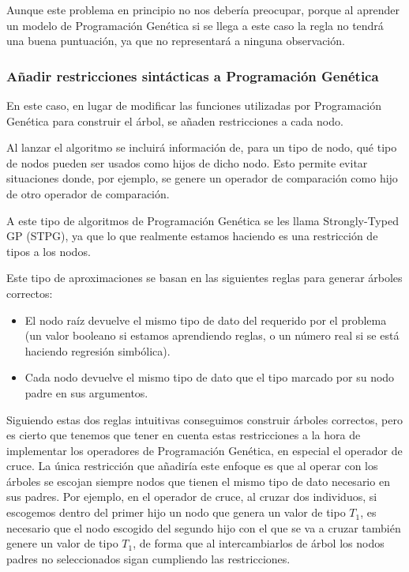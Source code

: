 Aunque este problema en principio no nos debería preocupar, porque al aprender un modelo de Programación Genética si se llega a este caso la regla no tendrá una buena puntuación, ya que no representará a ninguna observación.

\subsubsection{Añadir restricciones sintácticas a Programación Genética}

En este caso, en lugar de modificar las funciones utilizadas por Programación Genética para construir el árbol, se añaden restricciones a cada nodo.

Al lanzar el algoritmo se incluirá información de, para un tipo de nodo, qué tipo de nodos pueden ser usados como hijos de dicho nodo. Esto permite evitar situaciones donde, por ejemplo, se genere un operador de comparación como hijo de otro operador de comparación.

A este tipo de algoritmos de Programación Genética se les llama Strongly-Typed GP (STPG), ya que lo que realmente estamos haciendo es una restricción de tipos a los nodos.

Este tipo de aproximaciones se basan en las siguientes reglas para generar árboles correctos:

\begin{itemize}
	\item El nodo raíz devuelve el mismo tipo de dato del requerido por el problema (un valor booleano si estamos aprendiendo reglas, o un número real si se está haciendo regresión simbólica).
	\item Cada nodo devuelve el mismo tipo de dato que el tipo marcado por su nodo padre en sus argumentos.
\end{itemize}

Siguiendo estas dos reglas intuitivas conseguimos construir árboles correctos, pero es cierto que tenemos que tener en cuenta estas restricciones a la hora de implementar los operadores de Programación Genética, en especial el operador de cruce. La única restricción que añadiría este enfoque es que al operar con los árboles se escojan siempre nodos que tienen el mismo tipo de dato necesario en sus padres. Por ejemplo, en el operador de cruce, al cruzar dos individuos, si escogemos dentro del primer hijo un nodo que genera un valor de tipo $T_1$, es necesario que el nodo escogido del segundo hijo con el que se va a cruzar también genere un valor de tipo $T_1$, de forma que al intercambiarlos de árbol los nodos padres no seleccionados sigan cumpliendo las restricciones.


